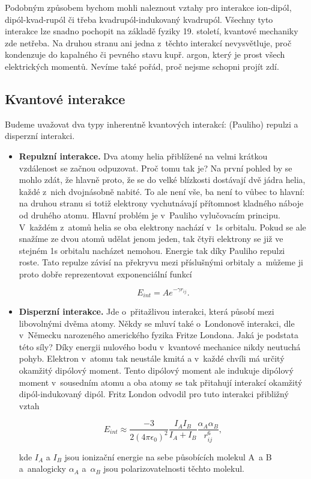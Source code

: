 Podobným způsobem bychom mohli naleznout vztahy pro interakce ion-dipól, dipól-kvad-rupól či třeba kvadrupól-indukovaný kvadrupól. Všechny tyto interakce lze snadno pochopit na základě fyziky 19. století, kvantové mechaniky zde netřeba. Na druhou stranu ani jedna z~těchto interakcí nevysvětluje, proč kondenzuje do kapalného či pevného stavu kupř. argon, který je prost všech elektrických momentů. Nevíme také pořád, proč nejsme schopni projít zdí.

\subsection{Kvantové interakce}   

Budeme uvažovat dva typy inherentně kvantových interakcí: (Pauliho) repulzi a disperzní interakci.

\begin{itemize} 

\item \textbf{Repulzní interakce.} Dva atomy helia přiblížené na velmi krátkou vzdálenost se začnou odpuzovat. Proč tomu tak je? Na první pohled by se mohlo zdát, že hlavně proto, že se do velké blízkosti dostávají dvě jádra helia, každé z~nich dvojnásobně nabité. To ale není vše, ba není to vůbec to hlavní: na druhou stranu si totiž elektrony vychutnávají přítomnost kladného náboje od druhého atomu. Hlavní problém je v~Pauliho vylučovacím principu. V~každém z~atomů helia se oba elektrony nachází v~1s orbitalu. Pokud se ale snažíme  ze dvou atomů udělat jenom jeden, tak čtyři elektrony se již ve stejném 1s orbitalu nacházet nemohou. Energie tak díky Pauliho repulzi roste. Tato repulze závisí na překryvu mezi příslušnými orbitaly a~můžeme ji proto dobře reprezentovat exponenciální funkcí
   

\begin{equation}
E_{int} = A e^{- \gamma r_{ij}}.
\label{rov:MS-4}
\end{equation}


\item \textbf{Disperzní interakce.} Jde o~přitažlivou interakci, která působí mezi libovolnými dvěma atomy. Někdy se mluví také o~Londonově interakci, dle v~Německu narozeného amerického fyzika Fritze Londona. Jaká je podstata této síly? Díky energii nulového bodu v~kvantové mechanice nikdy neutuchá pohyb. Elektron v~atomu tak neustále kmitá a v~každé chvíli má určitý okamžitý dipólový moment. Tento dipólový moment ale indukuje dipólový moment v~sousedním atomu a oba atomy se tak přitahují interakcí okamžitý dipól-indukovaný dipól. Fritz London odvodil pro tuto interakci přibližný vztah

\begin{equation}
E_{int} \approx \frac{-3}{2 (4 \pi \epsilon_0)^2} \frac{I_A I_B}{I_A + I_B} \frac{\alpha_A \alpha_B}{r_{ij}^6},
\label{rov:MS-5}
\end{equation}

\noindent 
kde $I_A$ a $I_B$ jsou ionizační energie na sebe působících molekul A~a B a~analogicky $\alpha_A$ a~$\alpha_B$ jsou polarizovatelnosti těchto molekul.  
\end{itemize}

